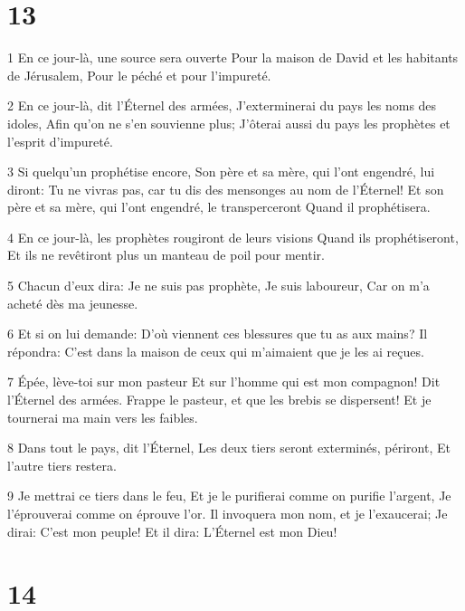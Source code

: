 \chapter{13}

\par 1 En ce jour-là, une source sera ouverte Pour la maison de David et les habitants de Jérusalem, Pour le péché et pour l'impureté.
\par 2 En ce jour-là, dit l'Éternel des armées, J'exterminerai du pays les noms des idoles, Afin qu'on ne s'en souvienne plus; J'ôterai aussi du pays les prophètes et l'esprit d'impureté.
\par 3 Si quelqu'un prophétise encore, Son père et sa mère, qui l'ont engendré, lui diront: Tu ne vivras pas, car tu dis des mensonges au nom de l'Éternel! Et son père et sa mère, qui l'ont engendré, le transperceront Quand il prophétisera.
\par 4 En ce jour-là, les prophètes rougiront de leurs visions Quand ils prophétiseront, Et ils ne revêtiront plus un manteau de poil pour mentir.
\par 5 Chacun d'eux dira: Je ne suis pas prophète, Je suis laboureur, Car on m'a acheté dès ma jeunesse.
\par 6 Et si on lui demande: D'où viennent ces blessures que tu as aux mains? Il répondra: C'est dans la maison de ceux qui m'aimaient que je les ai reçues.
\par 7 Épée, lève-toi sur mon pasteur Et sur l'homme qui est mon compagnon! Dit l'Éternel des armées. Frappe le pasteur, et que les brebis se dispersent! Et je tournerai ma main vers les faibles.
\par 8 Dans tout le pays, dit l'Éternel, Les deux tiers seront exterminés, périront, Et l'autre tiers restera.
\par 9 Je mettrai ce tiers dans le feu, Et je le purifierai comme on purifie l'argent, Je l'éprouverai comme on éprouve l'or. Il invoquera mon nom, et je l'exaucerai; Je dirai: C'est mon peuple! Et il dira: L'Éternel est mon Dieu!

\chapter{14}

